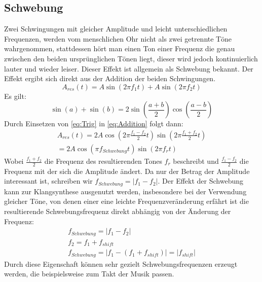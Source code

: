 \subsection{Schwebung}
Zwei Schwingungen mit gleicher Amplitude und leicht unterschiedlichen Frequenzen, werden vom menschlichen Ohr nicht als zwei getrennte Töne wahrgenommen, stattdessen hört man einen Ton einer Frequenz die genau zwischen den beiden ursprünglichen Tönen liegt, dieser wird jedoch kontinuierlich lauter und wieder leiser. Dieser Effekt ist allgemein als Schwebung bekannt. Der Effekt ergibt sich direkt aus der Addition der beiden Schwingungen.
\begin{equation}
    \label{eq:Addition}
    A_{res}(t) = A \sin(2\pi f_1t) + A \sin(2\pi f_2t)
\end{equation}
Es gilt:
\begin{equation}
    \label{eq:Trig}
   \sin(a) + \sin(b) = 2\sin(\frac{a+b}{2})\cos(\frac{a-b}{2})
\end{equation}
Durch Einsetzen von \ref{eq:Trig} in \ref{eq:Addition} folgt dann:
\begin{equation}
    \label{eq:Ergebnis}
    \begin{aligned}
        A_{res}(t) = 2 A \cos(2\pi \frac{f_1-f_2}{2}t) \sin(2\pi \frac{f_1+f_2}{2}t) \\
            = 2 A \cos(\pi f_{Schwebung}t) \sin(2\pi f_r t)
    \end{aligned}
\end{equation}
Wobei $\frac{f_1+f_2}{2}$ die Frequenz des resultierenden Tones $f_r$ beschreibt und $\frac{f_1-f_2}{2}$ die Frequenz mit der sich die Amplitude ändert. Da nur der Betrag der Amplitude interessant ist, schreiben wir $f_{Schwebung} = |f_1 - f_2|$.
Der Effekt der Schwebung kann zur Klangsynthese ausgenutzt werden, insbesondere bei der Verwendung gleicher Töne, von denen einer eine leichte Frequenzveränderung erfährt ist die resultierende Schwebungsfrequenz direkt abhängig von der Änderung der Frequenz:
\begin{equation}
    \begin{gathered}
    f_{Schwebung} = |f_1 - f_2| \\
    f_2 = f_1 + f_{shift} \\
    f_{Schwebung} = |f_1 - (f_1 + f_{shift})| = |f_{shift}|
    \end{gathered}
\end{equation}
Durch diese Eigenschaft können sehr gezielt Schwebungsfrequenzen erzeugt werden, die beispielsweise zum Takt der Musik passen.

